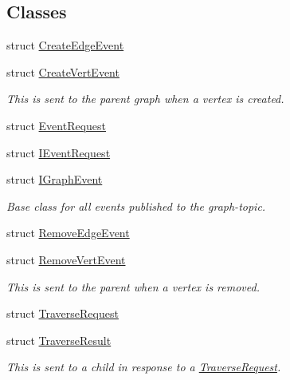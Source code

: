 \subsection*{Classes}
\begin{DoxyCompactItemize}
\item 
struct \hyperlink{struct_graph_connector_1_1_create_edge_event}{Create\+Edge\+Event}
\item 
struct \hyperlink{struct_graph_connector_1_1_create_vert_event}{Create\+Vert\+Event}
\begin{DoxyCompactList}\small\item\em This is sent to the parent graph when a vertex is created. \end{DoxyCompactList}\item 
struct \hyperlink{struct_graph_connector_1_1_event_request}{Event\+Request}
\item 
struct \hyperlink{struct_graph_connector_1_1_i_event_request}{I\+Event\+Request}
\item 
struct \hyperlink{struct_graph_connector_1_1_i_graph_event}{I\+Graph\+Event}
\begin{DoxyCompactList}\small\item\em Base class for all events published to the graph-\/topic. \end{DoxyCompactList}\item 
struct \hyperlink{struct_graph_connector_1_1_remove_edge_event}{Remove\+Edge\+Event}
\item 
struct \hyperlink{struct_graph_connector_1_1_remove_vert_event}{Remove\+Vert\+Event}
\begin{DoxyCompactList}\small\item\em This is sent to the parent when a vertex is removed. \end{DoxyCompactList}\item 
struct \hyperlink{struct_graph_connector_1_1_traverse_request}{Traverse\+Request}
\item 
struct \hyperlink{struct_graph_connector_1_1_traverse_result}{Traverse\+Result}
\begin{DoxyCompactList}\small\item\em This is sent to a child in response to a \hyperlink{struct_graph_connector_1_1_traverse_request}{Traverse\+Request}. \end{DoxyCompactList}\end{DoxyCompactItemize}
